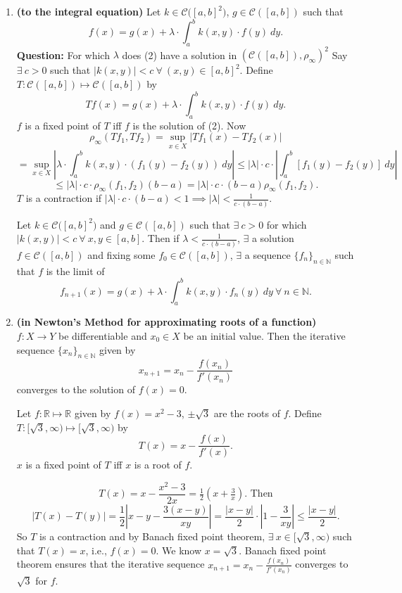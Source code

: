 \documentclass{functionspaces}
\begin{document}
\begin{enumerate}
\item \textbf{(to the integral equation)} Let $k\in\mathcal{C}\big([a,b]^{2}\big)$, $g\in\mathcal{C}([a,b])$ such that
\[
f(x)=g(x)+\lambda\cdot\int_{a}^{b}k(x,y)\cdot f(y)\ dy. \tag{2}
\]
\textbf{Question:} For which $\lambda$ does (2) have a solution in $(\mathcal{C}([a,b]),\rho_{\infty})^{2}$ Say $\exists\ c>0$ such that $|k(x,y)|<c\ \forall\ (x,y)\in[a,b]^{2}$. Define $T:\mathcal{C}([a,b])\mapsto\mathcal{C}([a,b])$ by
\[
Tf(x)=g(x)+\lambda\cdot\int_{a}^{b}k(x,y)\cdot f(y)\ dy.
\]
$f$ is a fixed point of $T$ iff $f$ is the solution of (2). Now
\[
\rho_{\infty}(Tf_{1},Tf_{2})=\sup_{x\in X}|Tf_{1}(x)-Tf_{2}(x)|
\]
\[
=\sup_{x\in X}\left|\lambda\cdot\int_{a}^{b}k(x,y)\cdot(f_{1}(y)-f_{2}(y))\ dy\right|\leq|\lambda|\cdot c\cdot\left|\int_{a}^{b}[f_{1}(y)-f_{2}(y)]\ dy\right|
\]
\[
\leq|\lambda|\cdot c\cdot\rho_{\infty}(f_{1},f_{2})(b-a)=|\lambda|\cdot c\cdot(b-a)\rho_{\infty}(f_{1},f_{2}).
\]
$T$ is a contraction if $|\lambda|\cdot c\cdot(b-a)<1\implies|\lambda|<\frac{1}{c\cdot(b-a)}$.

\begin{theorem}
Let $k\in\mathcal{C}\big([a,b]^{2}\big)$ and $g\in\mathcal{C}([a,b])$ such that $\exists\ c>0$ for which $|k(x,y)|<c\ \forall\ x,y\in[a,b]$. Then if $\lambda<\frac{1}{c\cdot(b-a)}$, $\exists$ a solution $f\in\mathcal{C}([a,b])$ and fixing some $f_{0}\in\mathcal{C}([a,b])$, $\exists$ a sequence $\{f_{n}\}_{n\in\mathbb{N}}$ such that $f$ is the limit of
\[
f_{n+1}(x)=g(x)+\lambda\cdot\int_{a}^{b}k(x,y)\cdot f_{n}(y)\ dy\ \forall\ n\in\mathbb{N}.
\]
\end{theorem}

\item \textbf{(in Newton's Method for approximating roots of a function)} $f:X\to Y$ be differentiable and $x_{0}\in X$ be an initial value. Then the iterative sequence $\{x_{n}\}_{n\in\mathbb{N}}$ given by
\[
x_{n+1}=x_{n}-\frac{f(x_{n})}{f'(x_{n})}
\]
converges to the solution of $f(x)=0$.

\begin{example}
Let $f:\mathbb{R}\mapsto\mathbb{R}$ given by $f(x)=x^{2}-3$, $\pm\sqrt{3}$ are the roots of $f$. Define $T:[\sqrt{3},\infty)\mapsto[\sqrt{3},\infty)$ by
\[
T(x)=x-\frac{f(x)}{f'(x)}.
\]
$x$ is a fixed point of $T$ iff $x$ is a root of $f$.

\[
T(x)=x-\frac{x^{2}-3}{2x}=\tfrac{1}{2}\left(x+\tfrac{3}{x}\right).\text{ Then}
\]
\[
|T(x)-T(y)|=\frac{1}{2}\left|x-y-\frac{3(x-y)}{xy}\right|=\frac{|x-y|}{2}\cdot\left|1-\frac{3}{xy}\right|\leq\frac{|x-y|}{2}.
\]
So $T$ is a contraction and by Banach fixed point theorem, $\exists\ x\in[\sqrt{3},\infty)$ such that $T(x)=x$, i.e., $f(x)=0$. We know $x=\sqrt{3}$. Banach fixed point theorem ensures that the iterative sequence $x_{n+1}=x_{n}-\frac{f(x_{n})}{f'(x_{n})}$ converges to $\sqrt{3}$ for $f$.
\end{example}
\end{enumerate}
\end{document}
